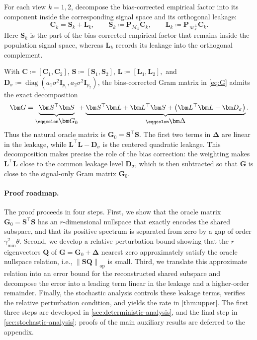 \documentclass[11pt]{article}
\newcommand{\trans}{\top}
\DeclareMathOperator{\diag}{diag}
\newcommand{\opn}[1]{\left\lVert #1\right\rVert_{\mathrm{op}}}
\newcommand{\cM}{\mathcal{M}}
\newcommand{\gmin}{\gamma_{\min}}
\begin{document}
 For each view $k=1,2$, decompose the bias-corrected empirical factor into its component inside the corresponding signal space and its orthogonal leakage:
\begin{equation}
\label{eq:SL}
  \bm C_k
  =
  \bm S_k+\bm L_k,
  \qquad
  \bm S_k
  \coloneqq
  \bm P_{\cM_k}\bm C_k,
  \qquad
  \bm L_k
  \coloneqq
  \bm P_{\cM_k^\perp}\bm C_k.
\end{equation}
Here $\bm S_k$ is the part of the bias-corrected empirical factor that remains inside the population signal space, whereas $\bm L_k$ records its leakage into the orthogonal complement. 

With $\bm C\coloneqq[\bm C_1,\bm C_2]$, 
$\bm S\coloneqq[\bm S_1,\bm S_2]$, 
  $\bm L\coloneqq[\bm L_1,\bm L_2],$ and 
$\bm D_\sigma
  \coloneqq
  \diag(
    a_1\sigma^2\bm I_{p_1},
    a_2\sigma^2\bm I_{p_2}
  )$, 
the bias-corrected Gram matrix in
\cref{eq:G} admits the exact decomposition
\begin{equation}
\label{eq:Delta}
  \bm G
  =
  \underbrace{\vphantom{\bigl(\bm L^\trans\bm L-\bm D_\sigma\bigr)}\bm S^\trans\bm S}_{\eqqcolon \displaystyle \bm G_0}
  +
  \underbrace{
    \bm S^\trans\bm L
    +
    \bm L^\trans\bm S
    +
    \bigl(\bm L^\trans\bm L-\bm D_\sigma\bigr)
  }_{\eqqcolon \displaystyle \bm\Delta}.
\end{equation}
Thus the natural oracle matrix is
$\bm G_0=\bm S^\trans\bm S$. The first two terms in
$\bm\Delta$ are linear in the leakage, while
$\bm L^\trans\bm L-\bm D_\sigma$ is the centered quadratic leakage.
This decomposition makes precise the role of the bias correction:
the weighting makes $\bm L^\trans\bm L$ close to the common leakage level
$\bm D_\sigma$, which is then subtracted so that $\bm G$ is close to the
signal-only Gram matrix $\bm G_0$.


\paragraph{Proof roadmap.} The proof proceeds in four steps. First, we show that the oracle matrix
$\bm G_0=\bm S^\trans\bm S$ has an $r$-dimensional nullspace that exactly
encodes the shared subspace, and that its positive spectrum is separated from
zero by a gap of order $\gmin^2\theta$. Second, we develop a relative
perturbation bound showing that the $r$ eigenvectors $\bm Q$ of
$\bm G=\bm G_0+\bm\Delta$ nearest zero approximately satisfy the oracle
nullspace relation, i.e., $\opn{\bm S\bm Q}$ is small.
Third, we translate this approximate relation into an error bound for the
reconstructed shared subspace and decompose the error into a leading term
linear in the leakage and a higher-order remainder. Finally, the stochastic
analysis controls these leakage terms, verifies the relative perturbation
condition, and yields the rate in \cref{thm:upper}. The first three steps are
developed in \cref{sec:deterministic-analysis}, and the final step in
\cref{sec:stochastic-analysis}; proofs of the main auxiliary results are
deferred to the appendix.
\end{document}
